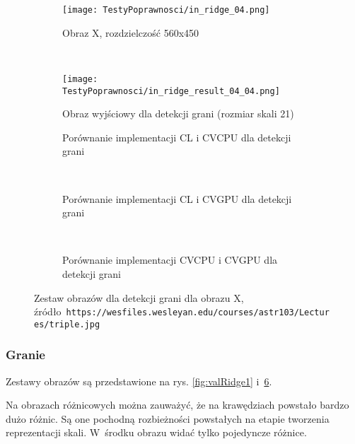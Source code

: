 \begin{figure}[h]

\begin{center}
\begin{subfigure}[t]{0.3\textwidth}
\texttt{[image: TestyPoprawnosci/in\_ridge\_04.png]}
\caption{Obraz X, rozdzielczość 560x450}
\label{fig:valRidge04}
\end{subfigure}
~
\begin{subfigure}[t]{0.3\textwidth}
\texttt{[image: TestyPoprawnosci/in\_ridge\_result\_04\_04.png]}
\caption{Obraz wyjściowy dla detekcji grani (rozmiar skali 21)}
\label{fig:valRidgeResult04}
\end{subfigure}
\end{center}

\begin{subfigure}[t]{0.3\textwidth}
	\centering
	\setlength\fboxsep{0pt}
	\setlength\fboxrule{0.5pt}
	\caption{Porównanie implementacji CL i CVCPU dla detekcji grani}
	\label{fig:valRidge4CLCVCPU}
\end{subfigure}
~
\begin{subfigure}[t]{0.3\textwidth}
	\centering
	\setlength\fboxsep{0pt}
	\setlength\fboxrule{0.5pt}
	\caption{Porównanie implementacji CL i CVGPU dla detekcji grani}
	\label{fig:valRidge4CLCVGPU}
\end{subfigure}
~
\begin{subfigure}[t]{0.3\textwidth}
	\centering
	\setlength\fboxsep{0pt}
	\setlength\fboxrule{0.5pt}
	\caption{Porównanie implementacji CVCPU i CVGPU dla detekcji grani}
	\label{fig:valRidge4CVCPUCVGPU}                 
\end{subfigure}
\caption{Zestaw obrazów dla detekcji grani dla obrazu X, \tiny{źródło~\texttt{https://wesfiles.wesleyan.edu/courses/astr103/Lectures/triple.jpg}}}

\label{fig:valRidge4}
\end{figure}

\subsubsection{Granie}
\label{subsubsec:granieRysunki}

Zestawy obrazów są przedstawione na rys. \ref{fig:valRidge1} i~\ref{fig:valRidge4}. 

Na obrazach różnicowych można zauważyć, że na krawędziach powstało bardzo dużo różnic. Są one pochodną rozbieżności powstałych na etapie tworzenia reprezentacji skali. W~środku obrazu widać tylko pojedyncze różnice. 
